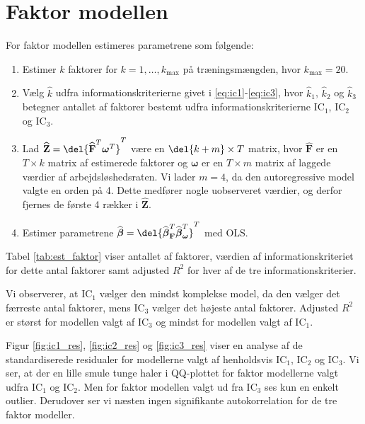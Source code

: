 \section{Faktor modellen}
For faktor modellen estimeres parametrene som følgende:
\begin{enumerate}
\item Estimer $k$ faktorer for $k = 1, \dots, k_{\max}$ på træningsmængden, hvor $k_{\max} = 20$.  
\item Vælg $\widehat{k}$ udfra informationskriterierne givet i \eqref{eq:ic1}-\eqref{eq:ic3}, hvor $\widehat{k}_1$, $\widehat{k}_2$ og $\widehat{k}_3$ betegner antallet af faktorer bestemt udfra informationskriterierne IC$_1$, IC$_2$ og IC$_3$.
\item Lad \(\widehat{\textbf{Z}} = \del{\widehat{{\textbf{F}}}^T\boldsymbol{\omega}^T}^T\) være en \(\del{k+m} \times T\) matrix, hvor \(\widehat{{\textbf{F}}}\) er en \(T \times k\) matrix af estimerede faktorer og \(\boldsymbol{\omega}\) er en \(T \times m\) matrix af laggede værdier af arbejdsløshedsraten.
Vi lader \(m = 4\), da den autoregressive model valgte en orden på 4.
Dette medfører nogle uobserveret værdier, og derfor fjernes de første 4 rækker i \(\widehat{\textbf{Z}}\).
\item Estimer parametrene $\widehat{\boldsymbol{\beta}} = \del{ \widehat{\boldsymbol{\beta}}^T_{\textbf{F}} \widehat{\boldsymbol{\beta}}^T_{\boldsymbol{\omega}}}^T$ med OLS.
\end{enumerate}

Tabel \ref{tab:est_faktor} viser antallet af faktorer, værdien af informationskriteriet for dette antal faktorer samt adjusted \(R^2\) for hver af de tre informationskriterier. 


Vi observerer, at IC$_1$ vælger den mindst komplekse model, da den vælger det færreste antal faktorer, mens IC$_3$ vælger det højeste antal faktorer. 
Adjusted \(R^2\) er størst for modellen valgt af IC$_3$ og mindst for modellen valgt af IC$_1$.

Figur \ref{fig:ic1_res}, \ref{fig:ic2_res} og \ref{fig:ic3_res} viser en analyse af de standardiserede residualer for modellerne valgt af henholdsvis IC$_1$, IC$_2$ og IC$_3$. 
Vi ser, at der en lille smule tunge haler i QQ-plottet for faktor modellerne valgt udfra IC$_1$ og IC$_2$. 
Men for faktor modellen valgt ud fra IC$_3$ ses kun en enkelt outlier. 
Derudover ser vi næsten ingen signifikante autokorrelation for de tre faktor modeller. 



